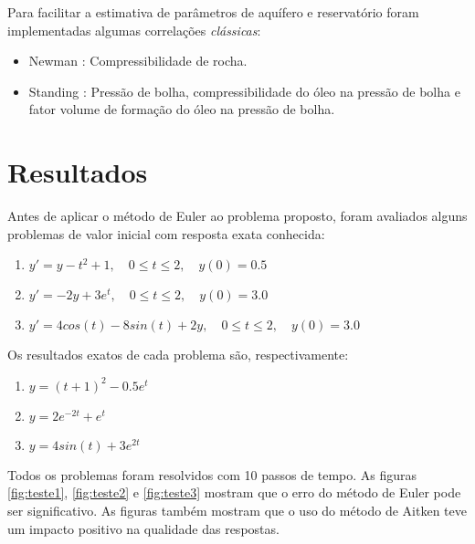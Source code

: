 \documentclass[final,5p]{elsarticle}
\numberwithin{equation}{section}
\begin{document}
        Para facilitar a estimativa de parâmetros de aquífero e reservatório foram implementadas algumas correlações \emph{clássicas}:

        \begin{itemize}
            \item Newman \cite{10.2118/3835-PA}: Compressibilidade de rocha.
            \item Standing \cite{standing1952volumetric}: Pressão de bolha, compressibilidade do óleo na pressão de bolha e fator volume de formação do óleo na pressão de bolha.
        \end{itemize}


\section{Resultados}

        Antes de aplicar o método de Euler ao problema proposto, foram avaliados alguns problemas de valor inicial com resposta exata conhecida:

        \begin{enumerate}
            \item $y' = y - t^2 + 1, \quad 0 \leq t \leq  2, \quad y(0) = 0.5$ \label{item:pvi1}
            \item $y' = -2y + 3 e^t, \quad 0 \leq t \leq  2, \quad y(0) = 3.0$ \label{item:pvi2}
            \item $y' = 4 cos(t) - 8 sin(t) + 2 y, \quad 0 \leq t \leq  2, \quad y(0) = 3.0$ \label{item:pvi3}
        \end{enumerate}

        Os resultados exatos de cada problema são, respectivamente:

        \begin{enumerate}
            \item $y = (t+1)^2 - 0.5 e^t$
            \item $y = 2 e^{-2 t} + e^t$
            \item $y = 4 sin(t) + 3 e^{2 t}$
        \end{enumerate}

        Todos os problemas foram resolvidos com 10 passos de tempo. As figuras \ref{fig:teste1}, \ref{fig:teste2} e \ref{fig:teste3} mostram que o erro do método de Euler pode ser significativo. As figuras também mostram que o uso do método de Aitken teve um impacto positivo na qualidade das respostas.
\end{document}
